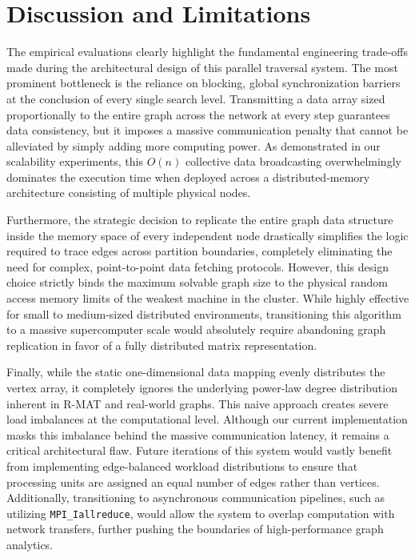 \vspace{1.2cm}
\section{Discussion and Limitations}

The empirical evaluations clearly highlight the fundamental engineering trade-offs made during the architectural design of this parallel traversal system. The most prominent bottleneck is the reliance on blocking, global synchronization barriers at the conclusion of every single search level. Transmitting a data array sized proportionally to the entire graph across the network at every step guarantees data consistency, but it imposes a massive communication penalty that cannot be alleviated by simply adding more computing power. As demonstrated in our scalability experiments, this $O(n)$ collective data broadcasting overwhelmingly dominates the execution time when deployed across a distributed-memory architecture consisting of multiple physical nodes.

Furthermore, the strategic decision to replicate the entire graph data structure inside the memory space of every independent node drastically simplifies the logic required to trace edges across partition boundaries, completely eliminating the need for complex, point-to-point data fetching protocols. However, this design choice strictly binds the maximum solvable graph size to the physical random access memory limits of the weakest machine in the cluster. While highly effective for small to medium-sized distributed environments, transitioning this algorithm to a massive supercomputer scale would absolutely require abandoning graph replication in favor of a fully distributed matrix representation.

Finally, while the static one-dimensional data mapping evenly distributes the vertex array, it completely ignores the underlying power-law degree distribution inherent in R-MAT and real-world graphs. This naive approach creates severe load imbalances at the computational level. Although our current implementation masks this imbalance behind the massive communication latency, it remains a critical architectural flaw. Future iterations of this system would vastly benefit from implementing edge-balanced workload distributions to ensure that processing units are assigned an equal number of edges rather than vertices. Additionally, transitioning to asynchronous communication pipelines, such as utilizing \texttt{MPI\_Iallreduce}, would allow the system to overlap computation with network transfers, further pushing the boundaries of high-performance graph analytics.
\vspace{1.2cm}
